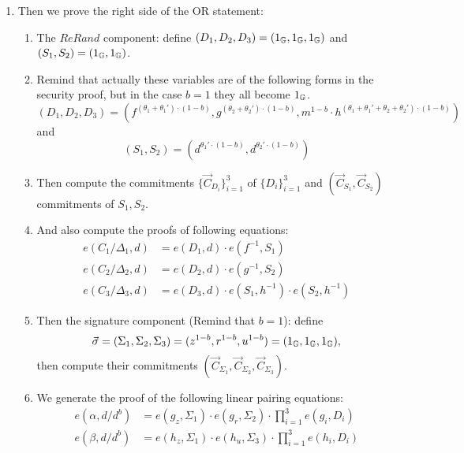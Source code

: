 \begin{description}
\begin{enumerate}
  \item Then we prove the right side of the OR statement:
    \begin{enumerate}  
    \item The $ReRand$ component: define $(D_1, D_2, D_3) = (1_{\mathbb{G}}, 1_{\mathbb{G}}, 1_{\mathbb{G}})$ and $(S_1,S_2) = (1_{\mathbb{G}}, 1_{\mathbb{G}})$.
    \item Remind that actually these variables are of the following forms in the security proof, but in the case $b=1$ they all become $1_{\mathbb{G}}$.
      $$(D_1, D_2, D_3) = (f^{(\theta_1+\theta_1')\cdot (1-b)},g^{(\theta_2+\theta_2')\cdot (1-b)},m^{1-b} \cdot h^{(\theta_1+\theta_1'+\theta_2+\theta_2')\cdot (1-b)})$$
      and $$(S_1, S_2) = (d^{\theta_1'\cdot (1-b)}, d^{\theta_2'\cdot (1-b)})$$
    \item Then compute the commitments $\{\vec{C}_{D_i}\}_{i=1}^3$ of $\{D_i\}_{i= 1}^3$ and $(\vec{C}_{S_1},\vec{C}_{S_2})$ commitments of $S_1,S_2$.
    \item And also compute the proofs of following equations:
      \begin{align}
        e(C_1/\boxed{\Delta_1}, d) &= e (\boxed{D_1},d) \cdot e(f^{-1}, \boxed{S_1}) \tag{8}\\
        e(C_2/\boxed{\Delta_2}, d) &= e (\boxed{D_2},d) \cdot e(g^{-1}, \boxed{S_2}) \tag{9}\\
        e(C_3/\boxed{\Delta_3}, d) &= e (\boxed{D_3},d) \cdot e(\boxed{S_1},h^{-1}) \cdot e(\boxed{S_2},h^{-1}) \tag{10}
      \end{align}

    \item Then the signature component (Remind that $b = 1$): define
      $$\vec{\sigma}  = (\Sigma_1, \Sigma_2, \Sigma_3) = (z^{1-b},r^{1-b},u^{1-b}) = (1_{\mathbb{G}}, 1_{\mathbb{G}}, 1_{\mathbb{G}}),$$
      then compute their commitments $(\vec{C}_{\Sigma_1}, \vec{C}_{\Sigma_2}, \vec{C}_{\Sigma_3})$.
    \item We generate the proof of the following linear pairing equations:
      \begin{align} 
        e(\alpha, d/\boxed{d^b}) &= e(g_z, \boxed{\Sigma_1}) \cdot e(g_r, \boxed{\Sigma_2}) \cdot \prod_{i=1}^3 e(g_i, \boxed{D_i}) \tag{11}\\
        e(\beta, d/\boxed{d^b}) &= e(h_z, \boxed{\Sigma_1}) \cdot e(h_u, \boxed{\Sigma_3}) \cdot \prod_{i=1}^3 e(h_i, \boxed{D_i}) \tag{12}
      \end{align}

    \end{enumerate}


\end{enumerate}
\end{description}
